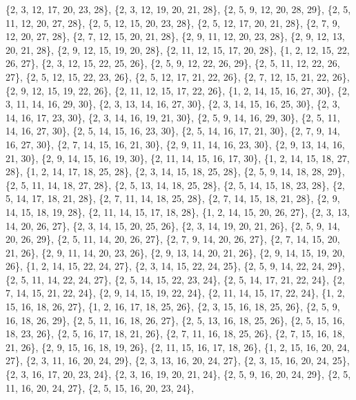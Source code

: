 \documentclass[11pt,a4paper]{article}
\begin{document}
{\{2, 3, 12, 17, 20, 23, 28\}, \{2, 3, 12, 19, 20, 21, 28\}, \{2, 5, 9, 12, 20, 28, 29\}, \{2, 5, 11, 12, 20, 27, 28\}, \{2, 5, 12, 15, 20, 23, 28\},
\{2, 5, 12, 17, 20, 21, 28\}, \{2, 7, 9, 12, 20, 27, 28\}, \{2, 7, 12, 15, 20, 21, 28\}, \{2, 9, 11, 12, 20, 23, 28\}, \{2, 9, 12, 13, 20, 21, 28\},
\{2, 9, 12, 15, 19, 20, 28\}, \{2, 11, 12, 15, 17, 20, 28\}, \{1, 2, 12, 15, 22, 26, 27\}, \{2, 3, 12, 15, 22, 25, 26\}, \{2, 5, 9, 12, 22, 26, 29\},
\{2, 5, 11, 12, 22, 26, 27\}, \{2, 5, 12, 15, 22, 23, 26\}, \{2, 5, 12, 17, 21, 22, 26\}, \{2, 7, 12, 15, 21, 22, 26\}, \{2, 9, 12, 15, 19, 22, 26\},
\{2, 11, 12, 15, 17, 22, 26\}, \{1, 2, 14, 15, 16, 27, 30\}, \{2, 3, 11, 14, 16, 29, 30\}, \{2, 3, 13, 14, 16, 27, 30\}, \{2, 3, 14, 15, 16, 25, 30\},
\{2, 3, 14, 16, 17, 23, 30\}, \{2, 3, 14, 16, 19, 21, 30\}, \{2, 5, 9, 14, 16, 29, 30\}, \{2, 5, 11, 14, 16, 27, 30\}, \{2, 5, 14, 15, 16, 23, 30\},
\{2, 5, 14, 16, 17, 21, 30\}, \{2, 7, 9, 14, 16, 27, 30\}, \{2, 7, 14, 15, 16, 21, 30\}, \{2, 9, 11, 14, 16, 23, 30\}, \{2, 9, 13, 14, 16, 21, 30\},
\{2, 9, 14, 15, 16, 19, 30\}, \{2, 11, 14, 15, 16, 17, 30\}, \{1, 2, 14, 15, 18, 27, 28\}, \{1, 2, 14, 17, 18, 25, 28\}, \{2, 3, 14, 15, 18, 25, 28\},
\{2, 5, 9, 14, 18, 28, 29\}, \{2, 5, 11, 14, 18, 27, 28\}, \{2, 5, 13, 14, 18, 25, 28\}, \{2, 5, 14, 15, 18, 23, 28\}, \{2, 5, 14, 17, 18, 21, 28\},
\{2, 7, 11, 14, 18, 25, 28\}, \{2, 7, 14, 15, 18, 21, 28\}, \{2, 9, 14, 15, 18, 19, 28\}, \{2, 11, 14, 15, 17, 18, 28\}, \{1, 2, 14, 15, 20, 26, 27\},
\{2, 3, 13, 14, 20, 26, 27\}, \{2, 3, 14, 15, 20, 25, 26\}, \{2, 3, 14, 19, 20, 21, 26\}, \{2, 5, 9, 14, 20, 26, 29\}, \{2, 5, 11, 14, 20, 26, 27\},
\{2, 7, 9, 14, 20, 26, 27\}, \{2, 7, 14, 15, 20, 21, 26\}, \{2, 9, 11, 14, 20, 23, 26\}, \{2, 9, 13, 14, 20, 21, 26\}, \{2, 9, 14, 15, 19, 20, 26\},
\{1, 2, 14, 15, 22, 24, 27\}, \{2, 3, 14, 15, 22, 24, 25\}, \{2, 5, 9, 14, 22, 24, 29\}, \{2, 5, 11, 14, 22, 24, 27\}, \{2, 5, 14, 15, 22, 23, 24\},
\{2, 5, 14, 17, 21, 22, 24\}, \{2, 7, 14, 15, 21, 22, 24\}, \{2, 9, 14, 15, 19, 22, 24\}, \{2, 11, 14, 15, 17, 22, 24\}, \{1, 2, 15, 16, 18, 26, 27\},
\{1, 2, 16, 17, 18, 25, 26\}, \{2, 3, 15, 16, 18, 25, 26\}, \{2, 5, 9, 16, 18, 26, 29\}, \{2, 5, 11, 16, 18, 26, 27\}, \{2, 5, 13, 16, 18, 25, 26\},
\{2, 5, 15, 16, 18, 23, 26\}, \{2, 5, 16, 17, 18, 21, 26\}, \{2, 7, 11, 16, 18, 25, 26\}, \{2, 7, 15, 16, 18, 21, 26\}, \{2, 9, 15, 16, 18, 19, 26\},
\{2, 11, 15, 16, 17, 18, 26\}, \{1, 2, 15, 16, 20, 24, 27\}, \{2, 3, 11, 16, 20, 24, 29\}, \{2, 3, 13, 16, 20, 24, 27\}, \{2, 3, 15, 16, 20, 24, 25\},
\{2, 3, 16, 17, 20, 23, 24\}, \{2, 3, 16, 19, 20, 21, 24\}, \{2, 5, 9, 16, 20, 24, 29\}, \{2, 5, 11, 16, 20, 24, 27\}, \{2, 5, 15, 16, 20, 23, 24\},
}
\end{document}
